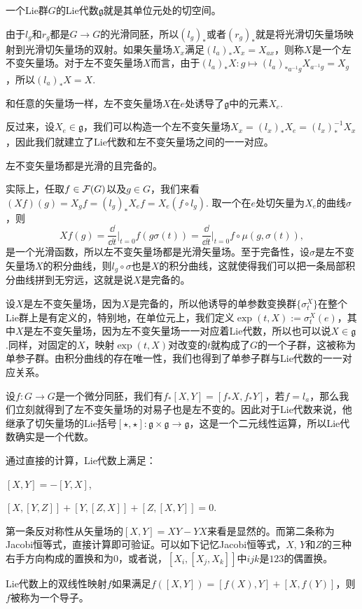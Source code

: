 \documentclass[9pt]{extarticle}
\newcommand{\lag}{{\mathfrak{g}}}
\begin{document}
\para 一个Lie群$G$的Lie代数$\lag$就是其单位元处的切空间。

由于$l_g$和$r_g$都是$G\to G$的光滑同胚，所以$(l_g)_*$或者$(r_g)_*$就是将光滑切矢量场映射到光滑切矢量场的双射。如果矢量场$X_x$满足$(l_a)_*X_x=X_{ax}$，则称$X$是一个左不变矢量场。对于左不变矢量场$X$而言，由于$(l_a)_*X:g\mapsto (l_a)_{*a^{-1}g}X_{a^{-1}g}=X_g$，所以$(l_a)_*X=X$.

和任意的矢量场一样，左不变矢量场$X$在$e$处诱导了$\lag$中的元素$X_e$.

反过来，设$X_e\in\lag$，我们可以构造一个左不变矢量场$X_x=(l_{x})_*X_e=(l_x)^{-1}_*X_x$，因此我们就建立了Lie代数和左不变矢量场之间的一一对应。

\para 左不变矢量场都是光滑的且完备的。

实际上，任取$f\in\mathcal{F}(G)$以及$g\in G$，我们来看$(Xf)(g)=X_gf=(l_g)_{*}X_ef=X_e(f\circ l_g)$. 取一个在$e$处切矢量为$X_e$的曲线$\sigma$，则
\[
	Xf(g)=\frac{\dd }{\dd t}\bigg|_{t=0}f(g\sigma(t))=\frac{\dd }{\dd t}\bigg|_{t=0}f\circ \mu(g,\sigma(t)),
\]
是一个光滑函数，所以左不变矢量场都是光滑矢量场。至于完备性，设$\sigma$是左不变矢量场$X$的积分曲线，则$l_g\circ \sigma$也是$X$的积分曲线，这就使得我们可以把一条局部积分曲线拼到无穷远，这就是说$X$是完备的。

\para 设$X$是左不变矢量场，因为$X$是完备的，所以他诱导的单参数变换群$\{\sigma^X_t\}$在整个Lie群上是有定义的，特别地，在单位元上，我们定义$\exp(t,X):=\sigma^X_t(e)$，其中$X$是左不变矢量场，因为左不变矢量场一一对应着Lie代数，所以也可以说$X\in \lag$.同样，对固定的$X$，映射$\exp(t,X)$对改变的$t$就构成了$G$的一个子群，这被称为单参子群。由积分曲线的存在唯一性，我们也得到了单参子群与Lie代数的一一对应关系。

\pro 设$f:G\to G$是一个微分同胚，我们有$f_*[X,Y]=[f_*X,f_*Y]$，若$f=l_a$，那么我们立刻就得到了左不变矢量场的对易子也是左不变的。因此对于Lie代数来说，他继承了切矢量场的Lie括号$[\star,\star]:\lag\times \lag\to \lag$，这是一个二元线性运算，所以Lie代数确实是一个代数。

通过直接的计算，Lie代数上满足：

 $[X,Y]=-[Y,X]$,

 $[X,[Y,Z]]+[Y,[Z,X]]+[Z,[X,Y]]=0$.

第一条反对称性从矢量场的$[X,Y]=XY-YX$来看是显然的。而第二条称为Jacobi恒等式，直接计算即可验证。可以如下记忆Jacobi恒等式，$X$, $Y$和$Z$的三种右手方向构成的置换和为$0$，或者说，$[X_i,[X_j,X_k]]$中$ijk$是$123$的偶置换。

\para Lie代数上的双线性映射$f$如果满足$f([X,Y])=[f(X),Y]+[X,f(Y)]$，则$f$被称为一个导子。
\end{document}
